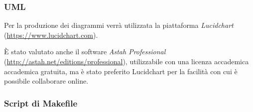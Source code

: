 		
		\subsubsection{UML}
		
		Per la produzione dei diagrammi \emph{} verrà utilizzata la piattaforma \emph{Lucidchart} (\url{https://www.lucidchart.com}).
		
		È stato valutato anche il software \emph{Astah Professional} (\url{http://astah.net/editions/professional}), utilizzabile con una licenza accademica accademica gratuita, ma è stato preferito Lucidchart per la facilità con cui è possibile collaborare online.
		

		\subsubsection{Script di Makefile}
		\label{makefile}

